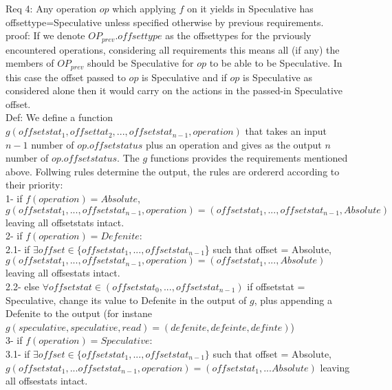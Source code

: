 \documentclass[a4paper, 11pt]{article}
\begin{document}
Req 4: Any operation $op$ which applying $f$ on it yields in Speculative has offsettype=Speculative unless specified otherwise by previous requirements.\\

proof: If we denote $OP_{prev}.offsettype$ as the offsettypes for the prviously encountered operations, considering all requirements this means all (if any) the members of $OP_{prev}$ should be Speculative for $op$ to be able to be Speculative. In this case the offset passed to $op$ is Speculative and if $op$ is Speculative as considered alone then it would carry on the actions in the passed-in Speculative offset.\\ 


Def: We define a function $g(offsetstat_1, offsettat_2, ..., offsetstat_{n-1}, operation)$ that takes an input  $n-1$ number of $op.offsetstatus$ plus an operation and gives as the output $n$ number of $op.offsetstatus$. The $g$ functions provides the requirements mentioned above. Follwing rules determine the output, the rules are ordererd according to their priority:\\

1- if $f(operation) = Absolute$, $g(offsetstat_1, ..., {offsetstat_{n-1}}, operation) = ({offsetstat_1}, ..., {offsetstat_{n-1}}, Absolute)$ leaving all offsetstats intact.\\

2- if $f(operation) = Defenite$:\\

\hspace{ 8mm}
	2.1- if $\exists offset \in \{offsetstat_1, ..., offsetstat_{n-1}$\} such that offset = Absolute,  $g(offsetstat_1, ..., offsetstat_{n-1}, operation) = (offsetstat_1, ... ,Absolute)$ leaving all offsestats intact.\\ 

\hspace{ 8mm}
	2.2- else $\forall offsetstat \in (offsetstat_0, ..., offsetstat_{n-1})$ if offsetstat = Speculative, change its value to Defenite in the output of $g$, plus appending a Defenite to the output (for instane $g(speculative, speculative, read) = (defenite, defeinte, definte)$)\\

3- if $f(operation) = Speculative$:\\

\hspace{ 8mm}
	3.1- if $\exists offset \in \{offsetstat_1, ..., offsetstat_{n-1}\}$ such that offset = Absolute, $g(offsetstat_1, ... offsetstat_{n-1}, operation) = (offsetstat_1, ... Absolute)$ leaving all offsestats intact.\\ 
\end{document}
